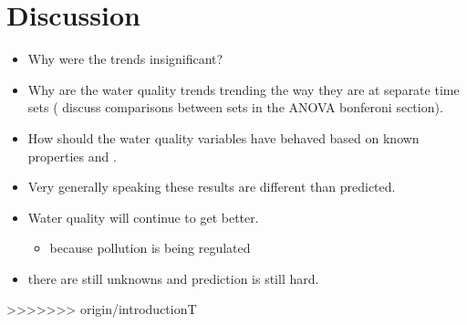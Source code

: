 \section{Discussion}
\begin{itemize}
	\item Why were the trends insignificant?
	\item Why are the water quality trends trending the way they are at separate time sets ( discuss comparisons between sets in the ANOVA bonferoni section).
	\item How should the water quality variables have behaved based on known properties and \citep{robinson2008ph}.
	\item Very generally speaking these results are different than \citep{robinson2008ph} predicted.
	\item Water quality will continue to get better.
	\begin{itemize}
		\item because pollution is being regulated
	\end{itemize}
	\item there are still unknowns and prediction is still hard.
\end{itemize}
>>>>>>> origin/introductionT
